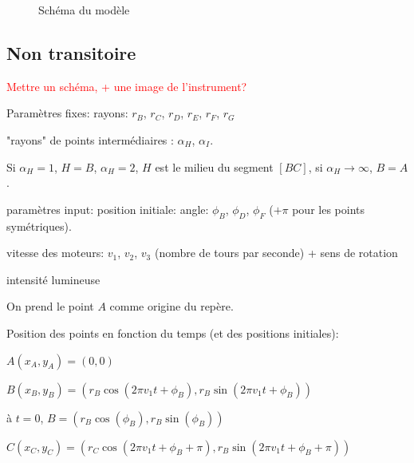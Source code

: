 \documentclass[11pt,a4paper]{article}
\newcommand{\FL}[1]{\textcolor{red}{#1}}
\begin{document}
\begin{figure}[H] 
\caption{Schéma du modèle}
\end{figure}


\subsection{Non transitoire}

\FL{Mettre un schéma, + une image de l'instrument?}

Paramètres fixes: 
rayons: $r_B$, $r_C$, $r_D$, $r_E$, $r_F$, $r_G$
 
"rayons" de points intermédiaires : $\alpha_H$, $\alpha_I$. 

Si $\alpha_H=1$, $H=B$, $\alpha_H=2$, $H$ est le milieu du segment $[BC]$, si $\alpha_H \rightarrow \infty$, $B=A$.


paramètres input: 
position initiale: angle: $\phi_B$, $\phi_D$, $\phi_F$
($+ \pi$ pour les points symétriques).

vitesse des moteurs: $v_1$, $v_2$, $v_3$ (nombre de tours par seconde) + sens de rotation

intensité lumineuse


On prend le point $A$ comme origine du repère.

Position des points en fonction du temps (et des positions initiales):

$A(x_A,y_A) = (0,0)$

$B(x_B,y_B) = (r_B \cos(2 \pi v_1 t + \phi_B),r_B \sin(2 \pi v_1 t + \phi_B))$

à $t=0$, $B = (r_B \cos(\phi_B), r_B \sin(\phi_B))$

$C(x_C,y_C) = (r_C \cos(2 \pi v_1 t + \phi_B + \pi),r_B \sin(2 \pi v_1 t + \phi_B + \pi))$
\end{document}
